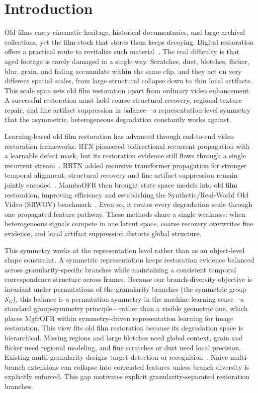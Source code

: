 \documentclass[symmetry,article,submit,pdftex,moreauthors]{Definitions/mdpi}
\begin{document}
%
\section{Introduction}
\label{sec:introduction}

Old films carry cinematic heritage, historical documentaries, and large archival collections, yet the film stock that stores them keeps decaying. Digital restoration offers a practical route to revitalize such material~\cite{iizuka2019deepremaster}. The real difficulty is that aged footage is rarely damaged in a single way. Scratches, dust, blotches, flicker, blur, grain, and fading accumulate within the same clip, and they act on very different spatial scales, from large structural collapse down to thin local artifacts. This scale span sets old film restoration apart from ordinary video enhancement. A successful restoration must hold coarse structural recovery, regional texture repair, and fine artifact suppression in balance---a representation-level symmetry that the asymmetric, heterogeneous degradation constantly works against.

Learning-based old film restoration has advanced through end-to-end video restoration frameworks. RTN pioneered bidirectional recurrent propagation with a learnable defect mask, but its restoration evidence still flows through a single recurrent stream~\cite{wan2022rtn}. RRTN added recursive transformer propagation for stronger temporal alignment; structural recovery and fine artifact suppression remain jointly encoded~\cite{lin2024rrtn}. MambaOFR then brought state space models into old film restoration, improving efficiency and establishing the Synthetic/Real-World Old Video (SRWOV) benchmark~\cite{mao2025mambaofr,gu2024mamba,guo2024mambair}. Even so, it routes every degradation scale through one propagated feature pathway. These methods share a single weakness: when heterogeneous signals compete in one latent space, coarse recovery overwrites fine evidence, and local artifact suppression distorts global structure.

This symmetry works at the representation level rather than as an object-level shape constraint. A symmetric representation keeps restoration evidence balanced across granularity-specific branches while maintaining a consistent temporal correspondence structure across frames. Because our branch-diversity objective is invariant under permutations of the granularity branches (the symmetric group $\mathcal{S}_G$), this balance is a permutation symmetry in the machine-learning sense---a standard group-symmetry principle---rather than a visible geometric one, which places MgfrOFR within symmetry-driven representation learning for image restoration. This view fits old film restoration because its degradation space is hierarchical. Missing regions and large blotches need global context, grain and flicker need regional modeling, and fine scratches or dust need local precision. Existing multi-granularity designs target detection or recognition~\cite{lin2017fpn,wang2021hrnet,sun2018pcb,wang2018mgn,gu2025reidmamba}. Naive multi-branch extensions can collapse into correlated features unless branch diversity is explicitly enforced. This gap motivates explicit granularity-separated restoration branches.
\end{document}
